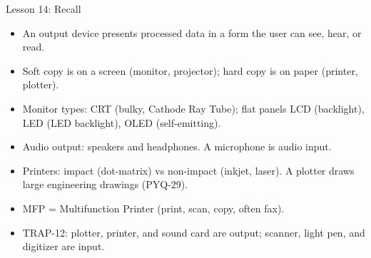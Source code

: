 \documentclass[aspectratio=169]{beamer}
\begin{document}
\begin{frame}{Lesson 14: Recall}
  \begin{itemize}
    \item An output device presents processed data in a form the user can see,
      hear, or read.
    \item Soft copy is on a screen (monitor, projector); hard copy is on
      paper (printer, plotter).
    \item Monitor types: CRT (bulky, Cathode Ray Tube); flat panels LCD
      (backlight), LED (LED backlight), OLED (self-emitting).
    \item Audio output: speakers and headphones. A microphone is audio input.
    \item Printers: impact (dot-matrix) vs non-impact (inkjet, laser). A
      plotter draws large engineering drawings (PYQ-29).
    \item MFP = Multifunction Printer (print, scan, copy, often fax).
    \item TRAP-12: plotter, printer, and sound card are output; scanner,
      light pen, and digitizer are input.
  \end{itemize}
\end{frame}
\end{document}

